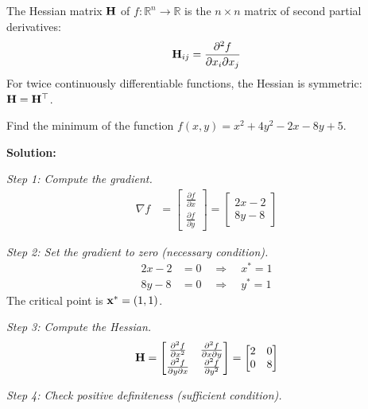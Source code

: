 \begin{keyconceptbox}[title=The Hessian Matrix]
The Hessian matrix $\mathbf{H}$ of $f: \mathbb{R}^n \to \mathbb{R}$ is the $n \times n$ matrix of second partial derivatives:
\begin{equation}
\mathbf{H}_{ij} = \frac{\partial^2 f}{\partial x_i \partial x_j}
\end{equation}
For twice continuously differentiable functions, the Hessian is symmetric: $\mathbf{H} = \mathbf{H}^\top$.
\end{keyconceptbox}



\begin{examplebox}[title=Example: Finding the Minimum of a Quadratic Function]
Find the minimum of the function $f(x, y) = x^2 + 4y^2 - 2x - 8y + 5$.

\textbf{Solution:}

\textit{Step 1: Compute the gradient.}
\begin{align}
\nabla f &= \begin{bmatrix} \frac{\partial f}{\partial x} \\ \frac{\partial f}{\partial y} \end{bmatrix} = \begin{bmatrix} 2x - 2 \\ 8y - 8 \end{bmatrix}
\end{align}

\textit{Step 2: Set the gradient to zero (necessary condition).}
\begin{align}
2x - 2 &= 0 \quad \Rightarrow \quad x^* = 1 \\
8y - 8 &= 0 \quad \Rightarrow \quad y^* = 1
\end{align}
The critical point is $\mathbf{x}^* = (1, 1)$.

\textit{Step 3: Compute the Hessian.}
\begin{equation}
\mathbf{H} = \begin{bmatrix} \frac{\partial^2 f}{\partial x^2} & \frac{\partial^2 f}{\partial x \partial y} \\ \frac{\partial^2 f}{\partial y \partial x} & \frac{\partial^2 f}{\partial y^2} \end{bmatrix} = \begin{bmatrix} 2 & 0 \\ 0 & 8 \end{bmatrix}
\end{equation}

\textit{Step 4: Check positive definiteness (sufficient condition).}


\end{examplebox}
